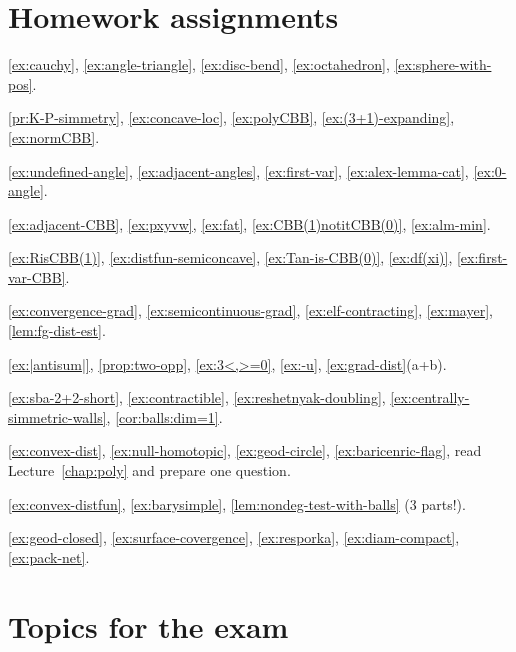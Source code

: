 \chapter*{Homework assignments}

\ref{ex:cauchy},
\ref{ex:angle-triangle},
\ref{ex:disc-bend},
\ref{ex:octahedron},
\ref{ex:sphere-with-pos}.

\ref{pr:K-P-simmetry},
\ref{ex:concave-loc},
\ref{ex:polyCBB},
\ref{ex:(3+1)-expanding},
\ref{ex:normCBB}.

\ref{ex:undefined-angle},
\ref{ex:adjacent-angles},
\ref{ex:first-var},
\ref{ex:alex-lemma-cat},
\ref{ex:0-angle}.

\ref{ex:adjacent-CBB},
\ref{ex:pxyvw},
\ref{ex:fat},
\ref{ex:CBB(1)notitCBB(0)},
\ref{ex:alm-min}.

\ref{ex:RisCBB(1)},
\ref{ex:distfun-semiconcave},
\ref{ex:Tan-is-CBB(0)},
\ref{ex:df(xi)},
\ref{ex:first-var-CBB}.

\ref{ex:convergence-grad},
\ref{ex:semicontinuous-grad},
\ref{ex:elf-contracting},
\ref{ex:mayer},
\ref{lem:fg-dist-est}.

\ref{ex:|antisum|},
\ref{prop:two-opp},
\ref{ex:3<,>=0},
\ref{ex:-u},
\ref{ex:grad-dist}(a+b).

\ref{ex:sba-2+2-short},
\ref{ex:contractible},
\ref{ex:reshetnyak-doubling},
\ref{ex:centrally-simmetric-walls},
\ref{cor:balls:dim=1}.

\ref{ex:convex-dist},
\ref{ex:null-homotopic},
\ref{ex:geod-circle},
\ref{ex:baricenric-flag},
read Lecture~\ref{chap:poly} and prepare one question.

\ref{ex:convex-distfun},
\ref{ex:barysimple},
\ref{lem:nondeg-test-with-balls} (3 parts!).

\ref{ex:geod-closed},
\ref{ex:surface-covergence},
\ref{ex:resporka},
\ref{ex:diam-compact},
\ref{ex:pack-net}.

\chapter*{Topics for the exam}

